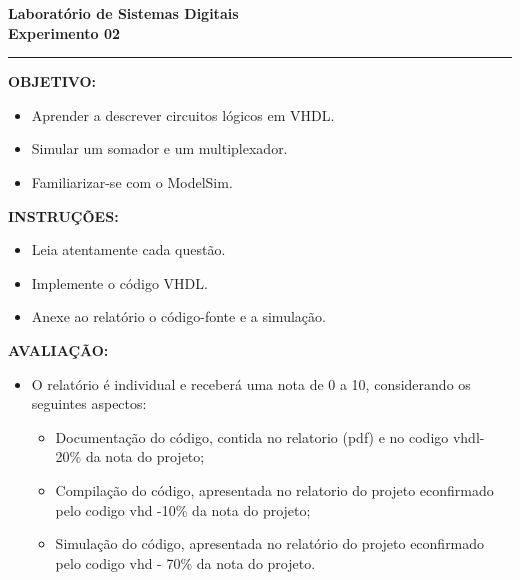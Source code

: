 \documentclass{article}
\begin{document}



\vspace{-0.25cm}
\begin{center}
    {\fontsize{16pt}{18pt} \textbf{Laboratório de Sistemas Digitais\\Experimento 02}}
\end{center}
\vspace{0.3cm}
\hrule

\vspace{1cm}
\noindent\textbf{OBJETIVO:}
\begin{itemize}
\item Aprender a descrever circuitos lógicos em VHDL.
\item Simular um somador e um multiplexador.
\item Familiarizar-se com o ModelSim.
\end{itemize}
\vspace{0.5cm}
\noindent\textbf{INSTRUÇÕES:}
\begin{itemize}
\item Leia atentamente cada questão.
\item Implemente o código VHDL.
\item Anexe ao relatório o código-fonte e a simulação.
\end{itemize}
\vspace{0.5cm}
\noindent\textbf{AVALIAÇÃO:}

\begin{itemize}
    \item O relatório é individual e receberá uma nota de 0 a 10, considerando os seguintes aspectos:
    \begin{itemize}
        \item Documentação do código, contida no relatorio (pdf) e no codigo vhdl- 20\% da nota do projeto;
        \item Compilação do código, apresentada no relatorio do projeto econfirmado pelo codigo vhd -10\% da nota do projeto;
        \item Simulação do código, apresentada no relatório do projeto econfirmado pelo codigo vhd - 70\% da nota do projeto.
    \end{itemize}
\end{itemize}
    
\newpage



\end{document}
